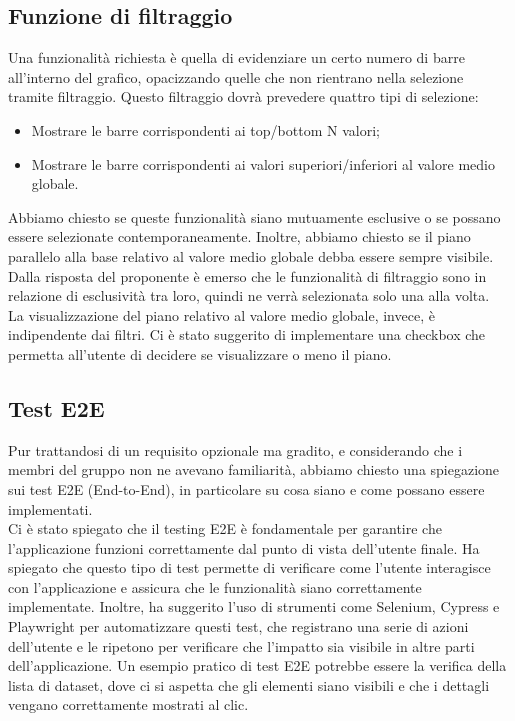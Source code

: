\subsection{Funzione di filtraggio}
Una funzionalità richiesta è quella di evidenziare un certo numero di barre all'interno del grafico, opacizzando quelle che non rientrano nella selezione tramite filtraggio. Questo filtraggio dovrà prevedere quattro tipi di selezione:

\begin{itemize} 
    \item Mostrare le barre corrispondenti ai top/bottom N valori; 
    \item Mostrare le barre corrispondenti ai valori superiori/inferiori al valore medio globale. 
\end{itemize}
Abbiamo chiesto se queste funzionalità siano mutuamente esclusive o se possano essere selezionate contemporaneamente. Inoltre, abbiamo chiesto se il piano parallelo alla base relativo al valore medio globale debba essere sempre visibile.\\
Dalla risposta del proponente è emerso che le funzionalità di filtraggio sono in relazione di esclusività tra loro, quindi ne verrà selezionata solo una alla volta.\\ La visualizzazione del piano relativo al valore medio globale, invece, è indipendente dai filtri. Ci è stato suggerito di implementare una checkbox che permetta all'utente di decidere se visualizzare o meno il piano.
\subsection{Test E2E}
Pur trattandosi di un requisito opzionale ma gradito, e considerando che i membri del gruppo non ne avevano familiarità, abbiamo chiesto una spiegazione sui test E2E (End-to-End), in particolare su cosa siano e come possano essere implementati.\\
Ci è stato spiegato che il testing E2E è fondamentale per garantire che l'applicazione funzioni correttamente dal punto di vista dell'utente finale. Ha spiegato che questo tipo di test permette di verificare come l'utente interagisce con l'applicazione e assicura che le funzionalità siano correttamente implementate. Inoltre, ha suggerito l'uso di strumenti come Selenium, Cypress e Playwright per automatizzare questi test, che registrano una serie di azioni dell'utente e le ripetono per verificare che l'impatto sia visibile in altre parti dell'applicazione. Un esempio pratico di test E2E potrebbe essere la verifica della lista di dataset, dove ci si aspetta che gli elementi siano visibili e che i dettagli vengano correttamente mostrati al clic.

